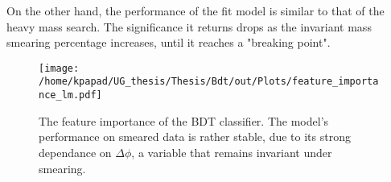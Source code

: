 On the other hand, the performance of the fit model is similar to that of the heavy mass search. The significance it returns drops as the invariant mass smearing percentage increases, until it reaches a "breaking point".
\begin{figure}[htbp]
\centering
\texttt{[image: /home/kpapad/UG\_thesis/Thesis/Bdt/out/Plots/feature\_importance\_lm.pdf]}
\caption{The feature importance of the BDT classifier. The model's performance on smeared data is rather stable, due to its strong dependance on $\Delta\phi$, a variable that remains invariant under smearing. }
\label{fig:LightFeatureImportance}
\end{figure}
